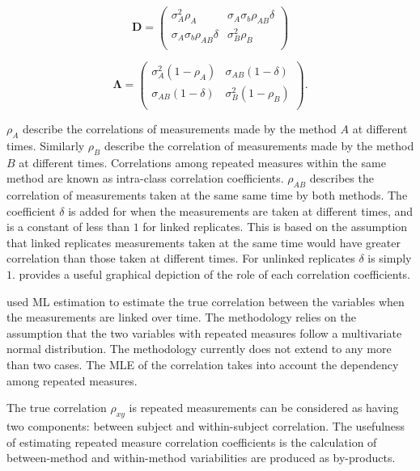 \documentclass[12pt, a4paper]{report}
\theoremstyle{plain}
\theoremstyle{definition}
\theoremstyle{remark}
\begin{document}
	\[
	\boldsymbol{D} = \left( \begin{array}{cc}
	\sigma^2_{A}\rho_{A} & \sigma_{A}\sigma_{b}\rho_{AB}\delta \\
	\sigma_{A}\sigma_{b}\rho_{AB}\delta & \sigma^2_{B}\rho_{B}\\
	
	\end{array}\right)
	\]
	
	\[
	\boldsymbol{\Lambda} = \left(
	\begin{array}{cc}
	\sigma^2_{A}(1-\rho_{A}) & \sigma_{AB}(1-\delta)  \\
	\sigma_{AB}(1-\delta) & \sigma^2_{B}(1-\rho_{B}) \\
	\end{array}\right).
	\]
	
	$\rho_{A}$ describe the correlations of measurements made by the method $A$ at different times. Similarly $\rho_{B}$ describe the correlation of measurements made by the method $B$ at different times. Correlations among repeated measures within the same method are known as intra-class correlation coefficients. $\rho_{AB}$ describes the correlation of measurements taken at the same same time by both methods. The coefficient $\delta$ is added for when the measurements are taken at different times, and is a constant of less than $1$ for linked replicates. This is based on the assumption that linked replicates measurements taken at the same time would have greater correlation than those taken at different times. For unlinked replicates $\delta$ is simply $1$. \citet{hamlett} provides a useful graphical depiction of the role of each correlation coefficients.
	
	\citet{lam} used ML estimation to estimate the true correlation between the variables when the measurements are linked over time. The methodology relies on the assumption that the two variables with repeated measures follow a multivariate normal distribution. The methodology currently does not extend to any more than two cases. The MLE of the correlation takes into account the dependency among repeated measures.
	
	The true correlation $\rho_{xy}$ is repeated measurements can be considered as having two components: between subject and within-subject correlation. The usefulness of estimating repeated measure correlation coefficients is the calculation of between-method and within-method variabilities are produced as by-products.
	
	
	
\end{document}
